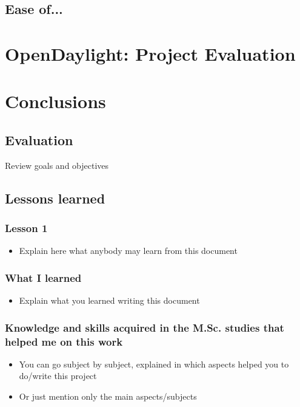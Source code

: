 \documentclass[a4paper, 12pt]{book}
\begin{document}
\section{Ease of...}
\label{chap:odltech_ease}

\chapter{OpenDaylight: Project Evaluation}
\label{chap:odlprojeval}


\chapter{Conclusions}
\label{chap:conclusions}


\section{Evaluation}
\label{sec:evaluation}


Review goals and objectives


\section{Lessons learned}
\label{sec:lessons}

\subsection{Lesson 1}
\begin{itemize}
 \item Explain here what anybody may learn from this document
\end{itemize}

\subsection{What I learned}
\begin{itemize}
 \item Explain what you learned writing this document
\end{itemize}

\subsection{Knowledge and skills acquired in the M.Sc. studies that helped me on
this work}
\begin{itemize}
 \item You can go subject by subject, explained in which aspects helped
you to do/write this project
 \item Or just mention only the main aspects/subjects

\end{itemize}
\end{document}
